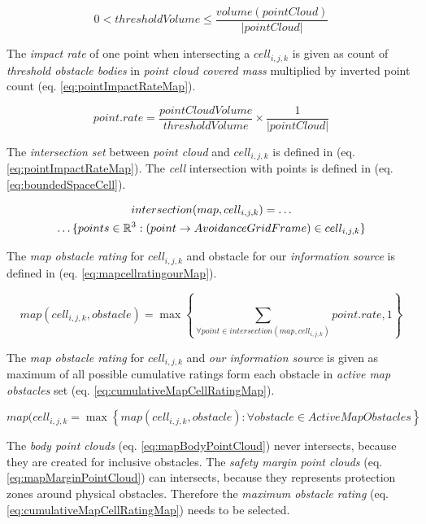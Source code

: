 \begin{equation}\label{eq:tresholdVolumeDefinition}
    0< threshold Volume \le \frac{volume(point Cloud)}{|point Cloud|}
\end{equation}

\noindent The \emph{impact rate} of one point  when intersecting a $cell_{i,j,k}$ is given as count of \emph{threshold obstacle bodies} in \emph{point cloud covered mass} multiplied by inverted point count (eq. \ref{eq:pointImpactRateMap}).

\begin{equation}\label{eq:pointImpactRateMap}
    point. rate = \frac{point Cloud Volume}{threshold Volume}\times\frac{1}{|point Cloud|}
\end{equation}

\noindent The \emph{intersection set} between \emph{point cloud} and $cell_{i,j,k}$ is defined in (eq. \ref{eq:pointImpactRateMap}). The \emph{cell} intersection with points is defined in (eq. \ref{eq:boundedSpaceCell}).

\begin{multline}\label{eq:pointcloudIntersectionMap}
    intersection(map,cell_{i,j,k}) =\dots\\\dots \{points \in \mathbb{R}^3: (point\to Avoidance Grid Frame) \in cell_{i,j,k}\}
\end{multline}

\noindent The \emph{map obstacle rating} for $cell_{i,j,k}$ and obstacle for our \emph{information source} is defined in (eq. \ref{eq:mapcellratingourMap}).

\begin{equation}\label{eq:mapcellratingourMap}
    map(cell_{i,j,k},obstacle) =\max\left\{ \sum_{\forall point\in intersection(map,cell_{i,j,k})}  point.rate , 1\right\}
\end{equation}

\noindent The \emph{map obstacle rating} for $cell_{i,j,k}$ and \emph{our information source} is given as maximum of all possible cumulative ratings form each obstacle in \emph{active map obstacles} set (eq. \ref{eq:cumulativeMapCellRatingMap}).

\begin{equation}\label{eq:cumulativeMapCellRatingMap}
    map(cell_{i,j,k} = \max \left\{map(cell_{i,j,k},obstacle):\forall obstacle \in Active Map Obstacles\right\}
\end{equation}

\begin{note}
    The \emph{body point clouds} (eq. \ref{eq:mapBodyPointCloud}) never intersects, because they are created for inclusive obstacles. The \emph{safety margin point clouds} (eq. \ref{eq:mapMarginPointCloud}) can intersects, because they represents protection zones around physical obstacles. Therefore the \emph{maximum obstacle rating} (eq. \ref{eq:cumulativeMapCellRatingMap}) needs to be selected.
\end{note}

